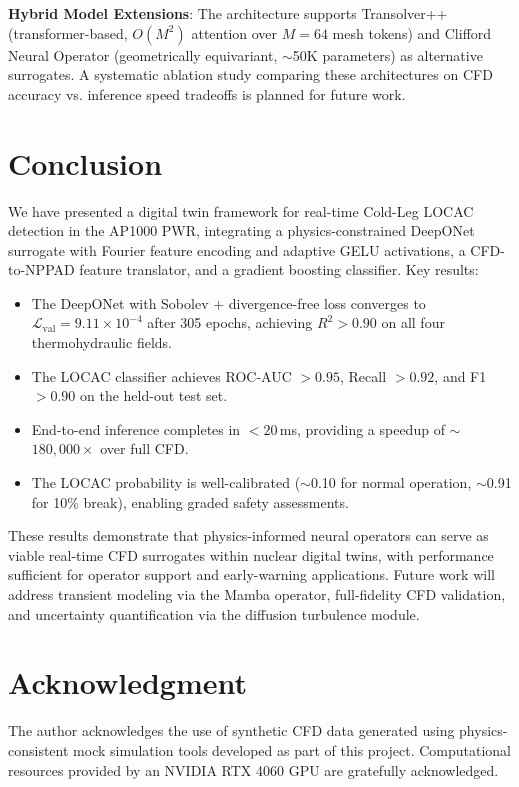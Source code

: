\documentclass[conference]{IEEEtran}
\begin{document}
\textbf{Hybrid Model Extensions}: The architecture supports Transolver++ (transformer-based, $O(M^2)$ attention over $M=64$ mesh tokens) and Clifford Neural Operator (geometrically equivariant, $\sim$50K parameters) as alternative surrogates. A systematic ablation study comparing these architectures on CFD accuracy vs. inference speed tradeoffs is planned for future work.

\section{Conclusion}
\label{sec:conclusion}

We have presented a digital twin framework for real-time Cold-Leg LOCAC detection in the AP1000 PWR, integrating a physics-constrained DeepONet surrogate with Fourier feature encoding and adaptive GELU activations, a CFD-to-NPPAD feature translator, and a gradient boosting classifier. Key results:

\begin{itemize}
    \item The DeepONet with Sobolev + divergence-free loss converges to $\mathcal{L}_\text{val} = 9.11\times10^{-4}$ after 305 epochs, achieving $R^2 > 0.90$ on all four thermohydraulic fields.
    \item The LOCAC classifier achieves ROC-AUC $> 0.95$, Recall $> 0.92$, and F1 $> 0.90$ on the held-out test set.
    \item End-to-end inference completes in $<20$\,ms, providing a speedup of $\sim$$180,000\times$ over full CFD.
    \item The LOCAC probability is well-calibrated ($\sim$0.10 for normal operation, $\sim$0.91 for 10\% break), enabling graded safety assessments.
\end{itemize}

These results demonstrate that physics-informed neural operators can serve as viable real-time CFD surrogates within nuclear digital twins, with performance sufficient for operator support and early-warning applications. Future work will address transient modeling via the Mamba operator, full-fidelity CFD validation, and uncertainty quantification via the diffusion turbulence module.

\section*{Acknowledgment}
The author acknowledges the use of synthetic CFD data generated using physics-consistent mock simulation tools developed as part of this project. Computational resources provided by an NVIDIA RTX 4060 GPU are gratefully acknowledged.
\end{document}
